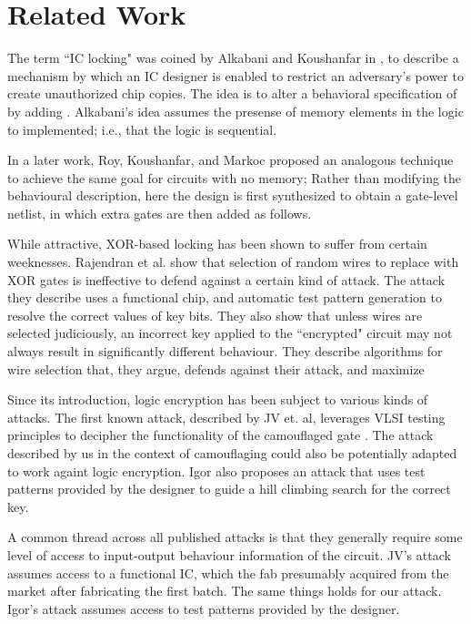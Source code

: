 \section{Related Work}
The term ``IC locking" was coined by Alkabani and Koushanfar in \cite{alkabani2007active}, to describe a mechanism by which an IC designer is enabled to restrict an adversary's power to create unauthorized chip copies. The idea is to alter a behavioral specification of by adding . Alkabani's idea assumes the presense of memory elements in the logic to implemented; i.e., that the logic is sequential.

In a later work, Roy, Koushanfar, and Markoc \cite{} proposed an analogous technique to achieve the same goal for circuits with no memory; Rather than modifying the behavioural description, here the design is first synthesized to obtain a gate-level netlist\cite{}, in which extra gates are then added as follows.


While attractive, XOR-based locking has been shown to suffer from certain weeknesses. Rajendran et al. show that selection of random wires to replace with XOR gates is ineffective to defend against a certain kind of attack. The attack they describe uses a functional chip, and automatic test pattern generation to resolve the correct values of key bits. They also show that unless wires are selected judiciously, an incorrect key applied to the ``encrypted" circuit may not always result in significantly different behaviour. They describe algorithms for wire selection that, they argue, defends against their attack, and maximize 

Since its introduction, logic encryption has been subject to various kinds of attacks. The first known attack, described by JV et. al, leverages VLSI testing principles to decipher the functionality of the camouflaged gate . The attack described by us in the context of camouflaging could also be potentially adapted to work againt logic encryption. Igor also proposes an attack that uses test patterns provided by the designer to guide a hill climbing search for the correct key.

A common thread across all published attacks is that they generally require some level of access to input-output behaviour information of the circuit. JV's attack assumes access to a functional IC, which the fab presumably acquired from the market after fabricating the first batch. The same things holds for our attack. Igor's attack assumes access to test patterns provided by the designer.


